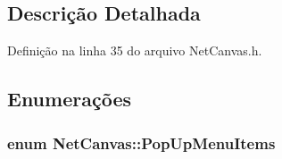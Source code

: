 \subsection{Descrição Detalhada}


Definição na linha 35 do arquivo Net\+Canvas.\+h.



\subsection{Enumerações}
\subsubsection[{Pop\+Up\+Menu\+Items}]{\setlength{\rightskip}{0pt plus 5cm}enum {\bf Net\+Canvas\+::\+Pop\+Up\+Menu\+Items}}\label{class_net_canvas_a66c9314ff9530c1c84652488bf788214}
